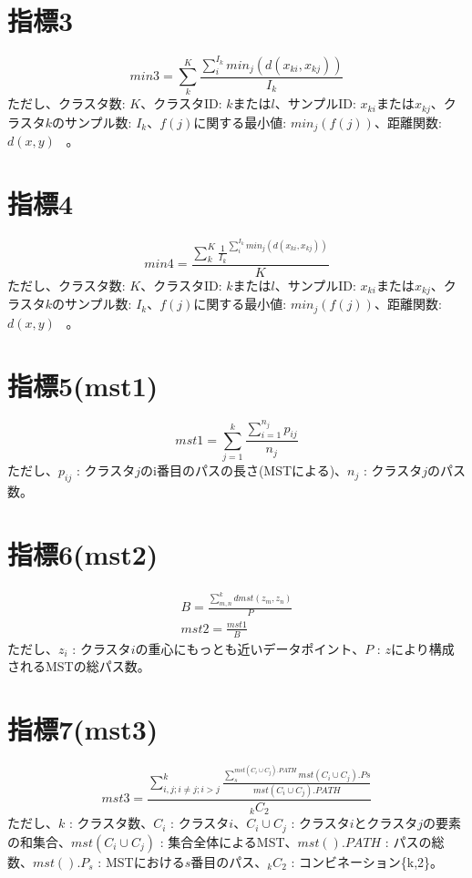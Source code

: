 ﻿\documentclass{article}
\begin{document}
\section{指標3}
\begin{equation}
min3={\sum_{k}^{K}{\frac{\sum_{i}^{I_k}{min_j(d(x_{ki},x_{kj}))}}{I_k}}}
\end{equation}
ただし、クラスタ数: $K$、クラスタID: $k$または$l$、サンプルID: $x_{ki}$または$x_{kj}$、クラスタ$k$のサンプル数: $I_k$、$f(j)$に関する最小値: $min_j(f(j))$、距離関数:$d(x,y)$  \ 。

\section{指標4}
\begin{equation}
min4={\frac{\sum_{k}^{K}{{\frac{1}{I_k}}^{\sum_{i}^{I_k}{min_j(d(x_{ki},x_{kj}))}}}}{K}}
\end{equation}
ただし、クラスタ数: $K$、クラスタID: $k$または$l$、サンプルID: $x_{ki}$または$x_{kj}$、クラスタ$k$のサンプル数: $I_k$、$f(j)$に関する最小値: $min_j(f(j))$、距離関数:$d(x,y)$  \ 。

\section{指標5(mst1)}
\begin{equation}
mst1 = { \sum_{j=1}^{k}{ \frac{\sum_{i=1}^{n_j}{p_{ij}}}{n_j} } }
\end{equation}
ただし、$p_{ij}$ : クラスタ$j$のi番目のパスの長さ(MSTによる)、$n_j$ : クラスタ$j$のパス数。

\section{指標6(mst2)}
\begin{eqnarray}
B = { \frac{\sum_{m,n}^{k}{dmst(z_m,z_n)}}{P} } \\
mst2 = { \frac{mst1}{B} }
\end{eqnarray}
ただし、$z_i$ : クラスタ$i$の重心にもっとも近いデータポイント、$P$ : $z$により構成されるMSTの総パス数。

\section{指標7(mst3)}
\begin{equation}
mst3 = { \frac{ \sum_{i,j;i\neq{}j;i>j}^{k}{ \frac{ \sum_{s}^{mst(C_i\cup{}C_j).PATH}{ mst(C_i\cup{}C_j).Ps } }{mst(C_i\cup{}C_j).PATH} } }{ {}_{k}C_2 } }
\end{equation}
ただし、$k$ : クラスタ数、$C_i$ : クラスタ$i$、$C_i\cup{}C_j$ : クラスタ$i$とクラスタ$j$の要素の和集合、$mst(C_i\cup{}C_j)$ : 集合全体によるMST、$mst().PATH$ : パスの総数、$mst().P_s$ : MSTにおける$s$番目のパス、${}_{k}C_2$ : コンビネーション\{k,2\}。
\end{document}
